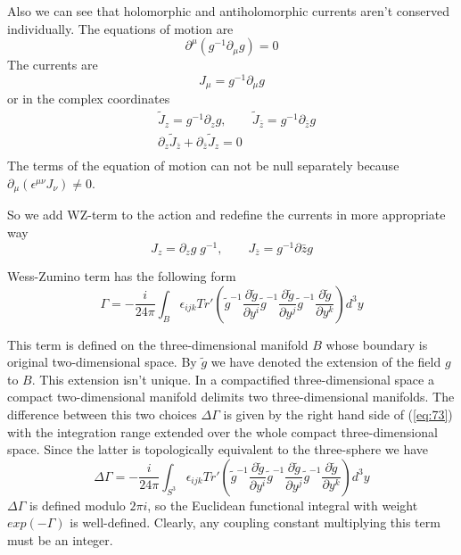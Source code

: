 \documentclass[a4paper,12pt]{article}
\theoremstyle{definition} \newtheorem{Def}{Definition}
\begin{document}
Also we can see that holomorphic and antiholomorphic currents aren't conserved individually. The equations of motion are
\begin{equation}
  \label{eq:71}
  \partial^{\mu}(g^{-1}\partial_{\mu}g)=0
\end{equation}
The currents are
\begin{equation}
  \label{eq:currents}
  J_{\mu}=g^{-1}\partial_{\mu}g
\end{equation}
or in the complex coordinates
\begin{equation}
  \label{eq:74}
  \begin{matrix}
    & \tilde{J}_z=g^{-1}\partial_z g, & \tilde{J}_{\bar{z}}=g^{-1}\partial_{\bar{z}}g\\
    & \partial_z \tilde{J}_{\bar{z}}+\partial_{\bar{z}}\tilde{J}_z=0 & \\
  \end{matrix}
\end{equation}
The terms of the equation of motion can not be null separately because $\partial_{\mu}(\epsilon^{\mu\nu}J_{\nu})\neq 0$.

So we add WZ-term to the action and redefine the currents in more appropriate way
\begin{equation}
  \label{eq:72}
  J_z=\partial_z g\;g^{-1}, \qquad J_{\bar{z}}=g^{-1}\partial{\bar z}g
\end{equation}

Wess-Zumino term has the following form
\begin{equation}
  \label{eq:73}
\Gamma=  - \frac{i }{24\pi} \int_{B}\epsilon_{ijk} Tr'\left(
    \tilde g^{-1}\frac{\partial \tilde g}{\partial y^i}
      \tilde g^{-1}\frac{\partial \tilde g}{\partial y^j}
      \tilde g^{-1}\frac{\partial \tilde g}{\partial y^k}\right) d^3y
\end{equation}

This term is defined on the three-dimensional manifold $B$ whose boundary is original two-dimensional space. By $\tilde{g}$ we have denoted the extension of the field $g$ to $B$. This extension isn't unique. In a compactified three-dimensional space a compact two-dimensional manifold delimits two three-dimensional manifolds. The difference between this two choices $\Delta\Gamma$ is given by the right hand side of (\ref{eq:73}) with the integration range extended over the whole compact three-dimensional space. Since the latter is topologically equivalent to the three-sphere we have
\begin{equation}
  \label{eq:75}
\Delta\Gamma=  - \frac{i }{24\pi} \int_{S^3}\epsilon_{ijk} Tr'\left(
    \tilde g^{-1}\frac{\partial \tilde g}{\partial y^i}
      \tilde g^{-1}\frac{\partial \tilde g}{\partial y^j}
      \tilde g^{-1}\frac{\partial \tilde g}{\partial y^k}\right) d^3y
\end{equation}
$\Delta\Gamma$ is defined modulo $2\pi i$, so the Euclidean functional integral with weight $exp(-\Gamma)$ is well-defined. Clearly, any coupling constant multiplying this term must be an integer. 
\end{document}
